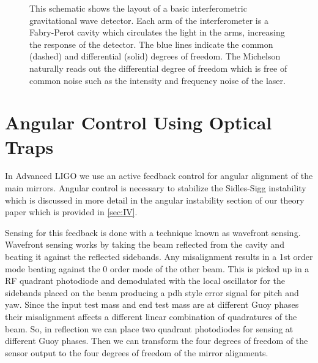 \begin{figure}[htb]
\centering
{}
\caption[LIGO Schematic]{This schematic shows the layout of a basic
    interferometric gravitational wave detector.
    Each arm of the interferometer is a Fabry-Perot cavity which circulates
    the light in the arms, increasing the response of the detector.
    The blue lines indicate the common (dashed) and differential (solid)
    degrees of freedom.
    The Michelson naturally reads out the differential degree of freedom which
    is free of common noise such as the intensity and frequency noise of the
    laser.
    }
\label{fig:ligoschematic}
\end{figure}



\section{Angular Control Using Optical Traps}

In Advanced LIGO we use an active feedback control for angular alignment of
the main mirrors\cite{aligowfs}.
Angular control is necessary to stabilize the Sidles-Sigg instability
\cite{2006PhLA..354..167S}
which is discussed in more detail in the angular instability section of our
theory paper which is provided in \ref{sec:IV}.

Sensing for this feedback is done with a technique known as wavefront sensing.
Wavefront sensing works by taking the beam reflected from the cavity and
beating it against the reflected sidebands.
Any misalignment results in a 1st order mode beating against the 0 order mode
of the other beam.
This is picked up in a RF quadrant photodiode and demodulated with the local
oscillator for the sidebands placed on the beam producing a \ac{pdh}
style error signal for pitch and yaw.
Since the input test mass and end test mass are at different Guoy phases
their misalignment affects a different linear combination of quadratures of the
beam.
So, in reflection we can place two quadrant photodiodes for sensing at
different Guoy phases.
Then we can transform the four degrees of freedom of the sensor output to the
four degrees of freedom of the mirror alignments.

